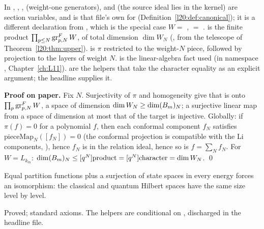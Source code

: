\begin{dictionary}
In , , ,  (weight-one generators),  and
 (the source ideal lies in the kernel) are section variables, and  is that file's
own  for  (Definition~\ref{l20:def:canonical});
it is a different declaration from , which is the special case
$W=$ ,  $=$ .  is the finite product
$\prod_{p\le N}\operatorname{gr}^F_{p,N}W$, of total dimension $\dim W_N$ (, from the telescope of
Theorem~\ref{l20:thm:upper}).  is $\pi$ restricted to the weight-$N$ piece, followed by projection to the
layers of weight $N$.  is the linear-algebra fact used (in namespace
, Chapter~\ref{ch:L11}).  are the helpers that take the character
equality as an explicit argument; the headline  supplies it.
\end{dictionary}

\textbf{Proof on paper.} Fix $N$. Surjectivity of $\pi$ and homogeneity give that  is onto $\prod_p\operatorname{gr}^F_{p,N}W$,
a space of dimension $\dim W_N\ge\dim(B_m)_N$; a surjective linear map from a space of dimension at most that of the
target is injective. Globally: if $\pi(f)=0$ for a polynomial $f$, then each conformal component $f_N$ satisfies
$\mathrm{pieceMap}_N([f_N])=0$ (the conformal projection is compatible with the Li components,
), hence $f_N$ is in the relation ideal, hence so is $f=\sum_Nf_N$. For
$W=L_{k_m}$: $\dim(B_m)_N\le[q^N]\mathrm{product}=[q^N]\mathrm{character}=\dim W_N$. \qed

\begin{physics}
Equal partition functions plus a surjection of state spaces in every energy forces an isomorphism: the classical
and quantum Hilbert spaces have the same size level by level.
\end{physics}

\begin{status}
Proved; standard axioms. The helpers are conditional on , discharged in the headline file.
\end{status}

